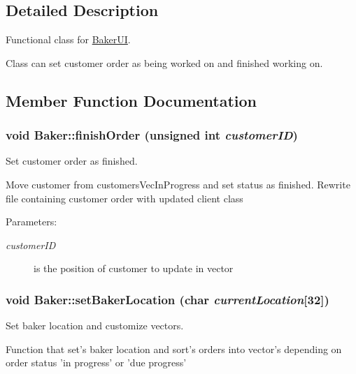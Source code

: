 \subsection{Detailed Description}
Functional class for \hyperlink{class_baker_u_i}{Baker\-UI}. 

Class can set customer order as being worked on and finished working on. 



\subsection{Member Function Documentation}
\hypertarget{class_baker_222a16bf113b70cbe0388a7291978a57}{
\subsubsection[finishOrder]{\setlength{\rightskip}{0pt plus 5cm}void Baker::finish\-Order (unsigned int {\em customer\-ID})}}
\label{class_baker_222a16bf113b70cbe0388a7291978a57}


Set customer order as finished. 

Move customer from customers\-Vec\-In\-Progress and set status as finished. Rewrite file containing customer order with updated client class

\begin{Desc}
\item[Parameters:]
\begin{description}
\item[{\em customer\-ID}]is the position of customer to update in vector \end{description}
\end{Desc}
\hypertarget{class_baker_b85151ecb20282d81b4dab489fea7dd8}{
\subsubsection[setBakerLocation]{\setlength{\rightskip}{0pt plus 5cm}void Baker::set\-Baker\-Location (char {\em current\-Location}\mbox{[}32\mbox{]})}}
\label{class_baker_b85151ecb20282d81b4dab489fea7dd8}


Set baker location and customize vectors. 

Function that set's baker location and sort's orders into vector's depending on order status 'in progress' or 'due progress'

